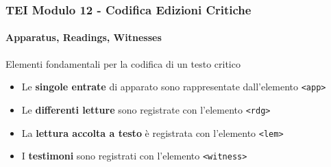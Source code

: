 \begin{frame}
    \frametitle{TEI Modulo 12 - Codifica Edizioni Critiche}
    \framesubtitle{Apparatus, Readings, Witnesses}
    \addtocounter{nframe}{1}











    \begin{block}{Elementi fondamentali per la codifica di un testo critico}
        \begin{itemize}
            \item Le \textbf{singole entrate} di apparato sono rappresentate dall'elemento \texttt{<app>}
            \item Le \textbf{differenti letture} sono registrate con l'elemento \texttt{<rdg>}
            \item La \textbf{lettura accolta a testo} è registrata con l'elemento \texttt{<lem>}
            \item I \textbf{testimoni} sono registrati con l'elemento \texttt{<witness>}
        \end{itemize}
       
    \end{block}


\end{frame}


